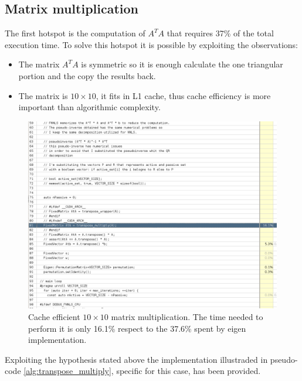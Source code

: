 \subsection{Matrix multiplication}
The first hotspot is the computation of $A^TA$ that requires 37\% of the total execution time. To solve this hotspot it is possible by exploiting the observations:
\begin{itemize}
    \item The matrix $A^TA$ is symmetric so it is enough calculate the one triangular portion and the copy the results back.
    \item The matrix is $10 \times 10$, it fits in L1 cache, thus cache efficiency is more important than algorithmic complexity.
\end{itemize}
\begin{figure}[ht]
  \includegraphics[width=\textwidth]{img/vtune_mine}
  \caption{Cache efficient $10 \times 10$ matrix multiplication. The time needed to perform it is only 16.1\% respect to the 37.6\% spent by eigen implementation.}
  \label{img:vtune_mine}
\end{figure}
Exploiting the hypothesis stated above the implementation illustraded in pseudo-code \ref{alg:transpose_multiply}, specific for this case, has been provided.\\
